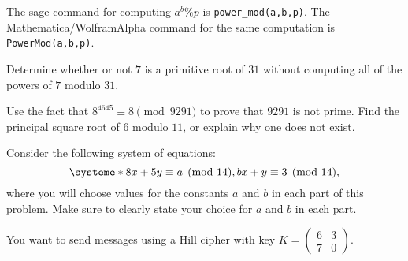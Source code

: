 \documentclass[11pt,addpoints,letterpaper]{exam}
\begin{document}
The sage command for computing $a^b\%p$ is \verb|power_mod(a,b,p)|. The Mathematica/WolframAlpha command for the same computation is \verb|PowerMod(a,b,p)|. 
\vfill





\newpage

\begin{questions}
\question[3] Determine whether or not $7$ is a primitive root of $31$ without computing all of the powers of $7$ modulo $31$.
\vfill

\question[3]Use the fact that $8^{4645}\equiv8\pmod{9291}$ to prove that $9291$ is not prime. 
\vfill 
\question[3]  Find the principal square root of $6$ modulo $11$, or explain why one does not exist. 
   
  \vfill
   \newpage
 \question Consider the following system of equations:
 $$\systeme*{8x+5y\equiv a \pmod{14}, bx+y\equiv 3 \pmod{14}},$$
where you will choose values for the constants $a$ and $b$ in each part of this problem. Make sure to clearly state your choice for $a$ and $b$ in each part.
\vfill
    \newpage



    \question You want to send messages using a Hill cipher with key $K=\begin{pmatrix}
6 & 3 \\7 &0
\end{pmatrix}.$ 


\end{questions}
\end{document}
